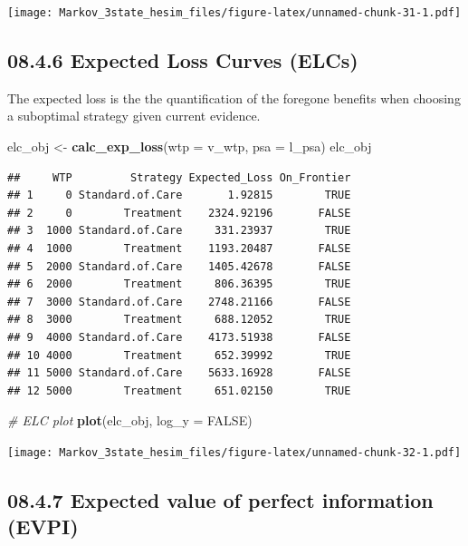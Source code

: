\documentclass[
]{article}
\newenvironment{Shaded}{\begin{snugshade}}{\end{snugshade}}
\newcommand{\CommentTok}[1]{\textcolor[rgb]{0.56,0.35,0.01}{\textit{#1}}}
\newcommand{\DataTypeTok}[1]{\textcolor[rgb]{0.13,0.29,0.53}{#1}}
\newcommand{\KeywordTok}[1]{\textcolor[rgb]{0.13,0.29,0.53}{\textbf{#1}}}
\newcommand{\NormalTok}[1]{#1}
\newcommand{\OtherTok}[1]{\textcolor[rgb]{0.56,0.35,0.01}{#1}}
\newcommand{\StringTok}[1]{\textcolor[rgb]{0.31,0.60,0.02}{#1}}
\begin{document}
\texttt{[image: Markov\_3state\_hesim\_files/figure-latex/unnamed-chunk-31-1.pdf]}

\hypertarget{expected-loss-curves-elcs}{%
\subsection{08.4.6 Expected Loss Curves
(ELCs)}\label{expected-loss-curves-elcs}}

The expected loss is the the quantification of the foregone benefits
when choosing a suboptimal strategy given current evidence.

\begin{Shaded}
\begin{Highlighting}[]
\NormalTok{elc_obj <-}\StringTok{ }\KeywordTok{calc_exp_loss}\NormalTok{(}\DataTypeTok{wtp =}\NormalTok{ v_wtp, }\DataTypeTok{psa =}\NormalTok{ l_psa)}
\NormalTok{elc_obj}
\end{Highlighting}
\end{Shaded}

\begin{verbatim}
##     WTP         Strategy Expected_Loss On_Frontier
## 1     0 Standard.of.Care       1.92815        TRUE
## 2     0        Treatment    2324.92196       FALSE
## 3  1000 Standard.of.Care     331.23937        TRUE
## 4  1000        Treatment    1193.20487       FALSE
## 5  2000 Standard.of.Care    1405.42678       FALSE
## 6  2000        Treatment     806.36395        TRUE
## 7  3000 Standard.of.Care    2748.21166       FALSE
## 8  3000        Treatment     688.12052        TRUE
## 9  4000 Standard.of.Care    4173.51938       FALSE
## 10 4000        Treatment     652.39992        TRUE
## 11 5000 Standard.of.Care    5633.16928       FALSE
## 12 5000        Treatment     651.02150        TRUE
\end{verbatim}

\begin{Shaded}
\begin{Highlighting}[]
\CommentTok{# ELC plot}
\KeywordTok{plot}\NormalTok{(elc_obj, }\DataTypeTok{log_y =} \OtherTok{FALSE}\NormalTok{)}
\end{Highlighting}
\end{Shaded}

\texttt{[image: Markov\_3state\_hesim\_files/figure-latex/unnamed-chunk-32-1.pdf]}

\hypertarget{expected-value-of-perfect-information-evpi}{%
\subsection{08.4.7 Expected value of perfect information
(EVPI)}\label{expected-value-of-perfect-information-evpi}}
\end{document}
